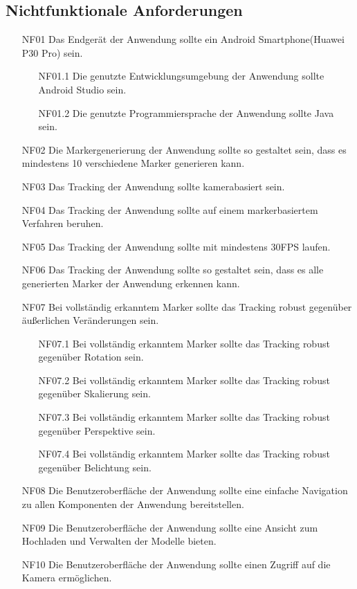 \subsection{Nichtfunktionale Anforderungen}
\begin{itemize}
\item[NF01] Das Endgerät der Anwendung sollte ein Android Smartphone(Huawei P30 Pro) sein.
\begin{enumerate}
\item[NF01.1] Die genutzte Entwicklungsumgebung der Anwendung sollte Android Studio sein.
\item[NF01.2] Die genutzte Programmiersprache der Anwendung sollte Java sein.
\end{enumerate}
\item[NF02] Die Markergenerierung der Anwendung sollte so gestaltet sein, dass es mindestens 10 verschiedene Marker generieren kann.
\item[NF03] Das Tracking der Anwendung sollte kamerabasiert sein.
\item[NF04] Das Tracking der Anwendung sollte auf einem markerbasiertem Verfahren beruhen.
\item[NF05] Das Tracking der Anwendung sollte mit mindestens 30FPS laufen.
\item[NF06] Das Tracking der Anwendung sollte so gestaltet sein, dass es alle generierten Marker der Anwendung erkennen kann.
\item[NF07] Bei vollständig erkanntem Marker sollte das Tracking robust gegenüber äußerlichen Veränderungen sein.
\begin{enumerate}
\item[NF07.1] Bei vollständig erkanntem Marker sollte das Tracking robust gegenüber Rotation sein.
\item[NF07.2] Bei vollständig erkanntem Marker sollte das Tracking robust gegenüber Skalierung
sein.
\item[NF07.3] Bei vollständig erkanntem Marker sollte das Tracking robust gegenüber Perspektive sein.
\item[NF07.4] Bei vollständig erkanntem Marker sollte das Tracking robust gegenüber Belichtung sein.
\end{enumerate}

\item[NF08] Die Benutzeroberfläche der Anwendung sollte eine einfache Navigation zu allen Komponenten der Anwendung bereitstellen.
\item[NF09] Die Benutzeroberfläche der Anwendung sollte eine Ansicht zum Hochladen und Verwalten der Modelle bieten.
\item[NF10] Die Benutzeroberfläche der Anwendung sollte einen Zugriff auf die Kamera ermöglichen.








\end{itemize}

